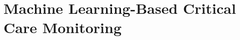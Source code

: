 \chapter{Machine Learning-Based Critical Care Monitoring}
\label{chap:ml-based-critical-care-monitoring}





